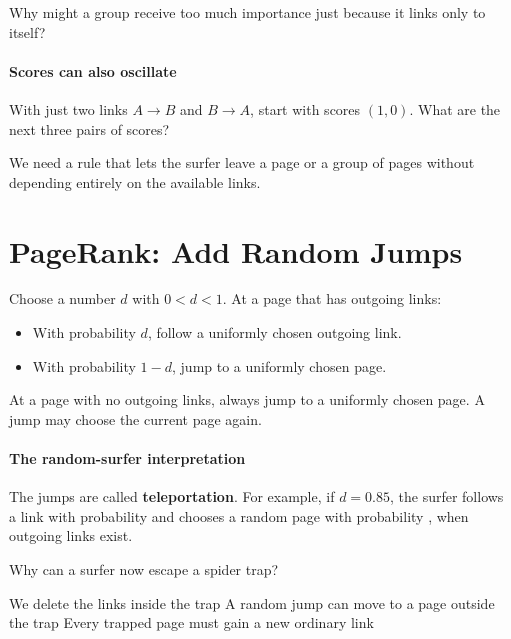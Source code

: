 \documentclass[11pt]{article}
\begin{document}
Why might a group receive too much importance just because it links only
to itself?
\vs{.8cm}

\paragraph{Scores can also oscillate}
With just two links $A\to B$ and $B\to A$, start with scores $(1,0)$.
What are the next three pairs of scores?
\vs{.8cm}

\vfill
We need a rule that lets the surfer leave a page or a group of pages without
depending entirely on the available links.

\newpage
\section{PageRank: Add Random Jumps}
Choose a number $d$ with $0<d<1$. At a page that has outgoing links:
\begin{itemize}
    \item With probability $d$, follow a uniformly chosen outgoing link.
    \item With probability $1-d$, jump to a uniformly chosen page.
\end{itemize}
At a page with no outgoing links, always jump to a uniformly chosen page.
A jump may choose the current page again.

\paragraph{The random-surfer interpretation}
The jumps are called \textbf{teleportation}. For example, if $d=0.85$, the
surfer follows a link with probability  and chooses a random page
with probability , when outgoing links exist.

\begin{Qu}
    Why can a surfer now escape a spider trap?
    \begin{itemize}
        \aitem We delete the links inside the trap
        \bitem A random jump can move to a page outside the trap
        \citem Every trapped page must gain a new ordinary link
    \end{itemize}
\end{Qu}
\end{document}
